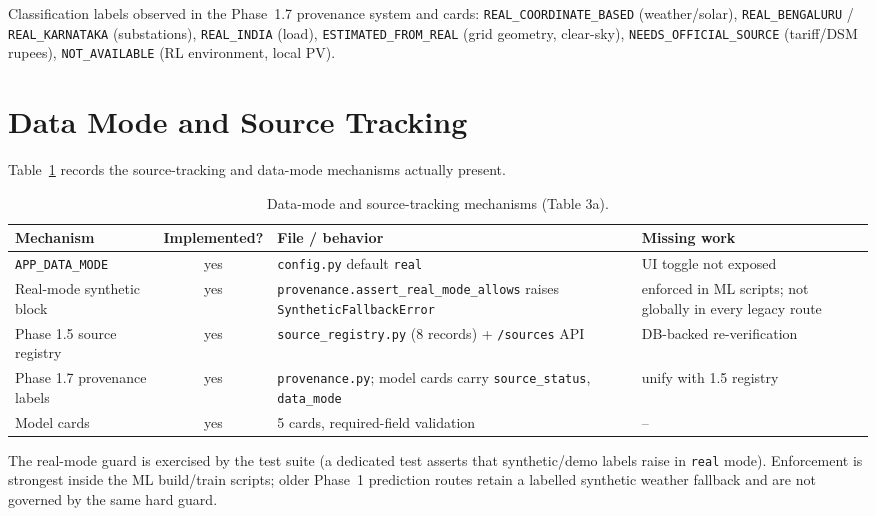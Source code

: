 \documentclass[11pt,a4paper]{article}
\newcommand{\yes}{\textcolor{cok}{yes}}
\newcommand{\code}[1]{\texttt{\small #1}}
\begin{document}
\noindent Classification labels observed in the Phase~1.7 provenance system and cards:
\code{REAL\_COORDINATE\_BASED} (weather/solar), \code{REAL\_BENGALURU} /
\code{REAL\_KARNATAKA} (substations), \code{REAL\_INDIA} (load),
\code{ESTIMATED\_FROM\_REAL} (grid geometry, clear-sky), \code{NEEDS\_OFFICIAL\_SOURCE}
(tariff/DSM rupees), \code{NOT\_AVAILABLE} (RL environment, local PV).

\section{Data Mode and Source Tracking}
Table~\ref{tab:datamode} records the source-tracking and data-mode mechanisms actually
present.

\begin{table}[H]
\centering
\caption{Data-mode and source-tracking mechanisms (Table 3a).}
\label{tab:datamode}
\footnotesize
\begin{tabular}{@{}p{3.2cm}c p{4.0cm}p{3.6cm}@{}}
\toprule
\textbf{Mechanism} & \textbf{Implemented?} & \textbf{File / behavior} & \textbf{Missing work}\\
\midrule
\code{APP\_DATA\_MODE} & \yes & \code{config.py} default \code{real} & UI toggle not exposed\\
Real-mode synthetic block & \yes & \code{provenance.assert\_real\_mode\_allows} raises \code{SyntheticFallbackError} & enforced in ML scripts; not globally in every legacy route\\
Phase 1.5 source registry & \yes & \code{source\_registry.py} (8 records) + \code{/sources} API & DB-backed re-verification\\
Phase 1.7 provenance labels & \yes & \code{provenance.py}; model cards carry \code{source\_status}, \code{data\_mode} & unify with 1.5 registry\\
Model cards & \yes & 5 cards, required-field validation & --\\
\bottomrule
\end{tabular}
\end{table}

\noindent The real-mode guard is exercised by the test suite (a dedicated test asserts
that synthetic/demo labels raise in \code{real} mode). Enforcement is strongest inside the
ML build/train scripts; older Phase~1 prediction routes retain a labelled synthetic
weather fallback and are not governed by the same hard guard.

\end{document}
